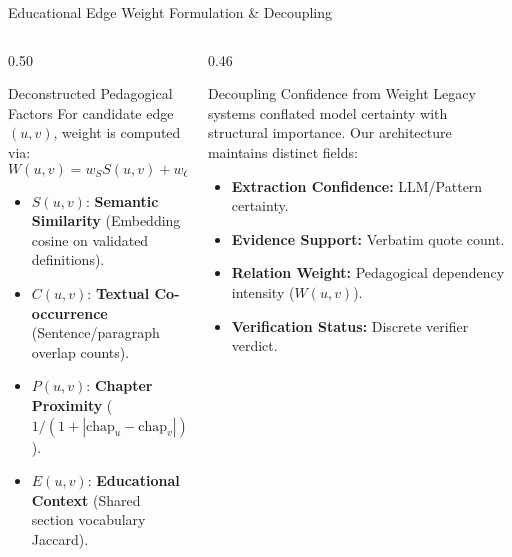 \documentclass[aspectratio=169,10pt]{beamer}
\begin{document}
\begin{frame}{Educational Edge Weight Formulation \& Decoupling}
    \begin{columns}[T]
        \begin{column}{0.50\textwidth}
            \begin{block}{Deconstructed Pedagogical Factors}
                \small
                For candidate edge $(u, v)$, weight is computed via:
                \begin{equation*}
                    W(u, v) = w_S S(u, v) + w_C C(u, v) + w_P P(u, v) + w_E E(u, v)
                \end{equation*}
                \footnotesize
                \begin{itemize}
                    \item $S(u, v)$: \textbf{Semantic Similarity} (Embedding cosine on validated definitions).
                    \item $C(u, v)$: \textbf{Textual Co-occurrence} (Sentence/paragraph overlap counts).
                    \item $P(u, v)$: \textbf{Chapter Proximity} ($1 / (1 + |\text{chap}_u - \text{chap}_v|)$).
                    \item $E(u, v)$: \textbf{Educational Context} (Shared section vocabulary Jaccard).
                \end{itemize}
            \end{block}
        \end{column}

        \begin{column}{0.46\textwidth}
            \begin{alertblock}{Decoupling Confidence from Weight}
                \footnotesize
                Legacy systems conflated model certainty with structural importance. Our architecture maintains distinct fields:
                \begin{itemize}
                    \item \textbf{Extraction Confidence:} LLM/Pattern certainty.
                    \item \textbf{Evidence Support:} Verbatim quote count.
                    \item \textbf{Relation Weight:} Pedagogical dependency intensity ($W(u, v)$).
                    \item \textbf{Verification Status:} Discrete verifier verdict.
                \end{itemize}
            \end{alertblock}
            

\end{column}
\end{columns}
\end{frame}
\end{document}

